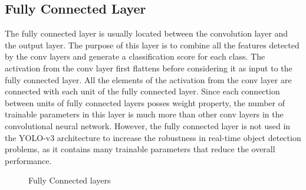 \subsection{Fully Connected Layer}
The fully connected layer is usually located between the convolution layer and the output layer. The purpose of this layer is to combine all the features detected by the conv layers and generate a classification score for each class. The activation from the conv layer first flattens before considering it as input to the fully connected layer. All the elements of the activation from the conv layer are connected with each unit of the fully connected layer. Since each connection between units of fully connected layers posses weight property, the number of trainable parameters in this layer is much more than other conv layers in the convolutional neural network. However, the fully connected layer is not used in the YOLO-v3 architecture to increase the robustness in real-time object detection problems, as it contains many trainable parameters that reduce the overall performance.    

\begin{figure}
    \centering
    \caption{Fully Connected layers}
    \label{fullyconnected}
\end{figure}